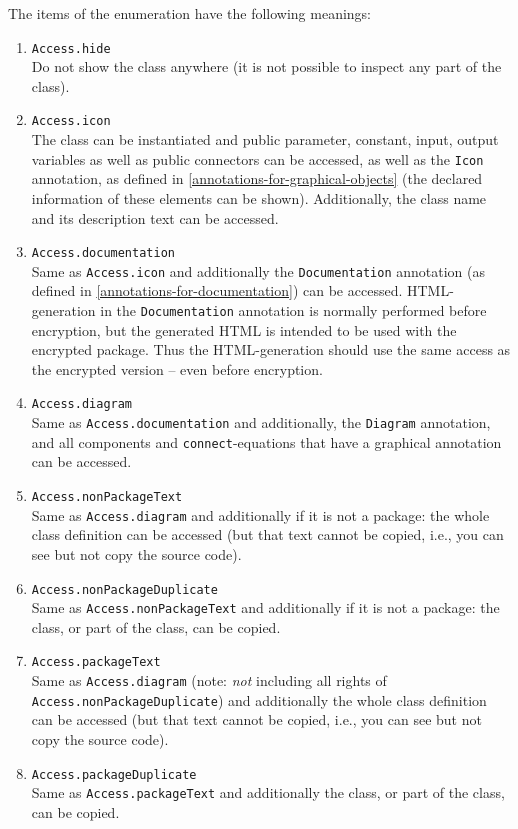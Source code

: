 The items of the  enumeration have the following meanings:
\begin{enumerate}
\item
  \lstinline!Access.hide!\\
  Do not show the class anywhere (it is not possible to inspect any part
  of the class).
\item
  \lstinline!Access.icon!\\
  The class can be instantiated and public parameter, constant, input, output variables as well as public connectors can be accessed, as well as the \lstinline!Icon! annotation, as defined in \cref{annotations-for-graphical-objects} (the declared information of these elements can be shown).  Additionally, the class name and its description text can be accessed.
\item
  \lstinline!Access.documentation!\\
  Same as \lstinline!Access.icon! and additionally the \lstinline!Documentation! annotation (as defined in \cref{annotations-for-documentation}) can be accessed.  HTML-generation in the \lstinline!Documentation! annotation is normally performed before encryption, but the generated HTML is intended to be used with the encrypted package.  Thus the HTML-generation should use the same access as the encrypted version -- even before encryption.
\item
  \lstinline!Access.diagram!\\
  Same as \lstinline!Access.documentation! and additionally, the \lstinline!Diagram! annotation, and all components and \lstinline!connect!-equations that have a graphical annotation can be accessed.
\item
  \lstinline!Access.nonPackageText!\\
  Same as \lstinline!Access.diagram! and additionally if it is not a package: the whole class definition can be accessed (but that text cannot be copied, i.e., you can see but not copy the source code).
\item
  \lstinline!Access.nonPackageDuplicate!\\
  Same as \lstinline!Access.nonPackageText! and additionally if it is not a package: the class, or part of the class, can be copied.
\item
  \lstinline!Access.packageText!\\
  Same as \lstinline!Access.diagram! (note: \emph{not} including all rights of \lstinline!Access.nonPackageDuplicate!) and additionally the whole class definition can be accessed (but that text cannot be copied, i.e., you can see but not copy the source code).
\item
  \lstinline!Access.packageDuplicate!\\
  Same as \lstinline!Access.packageText! and additionally the class, or part of the class, can be copied.
\end{enumerate}

